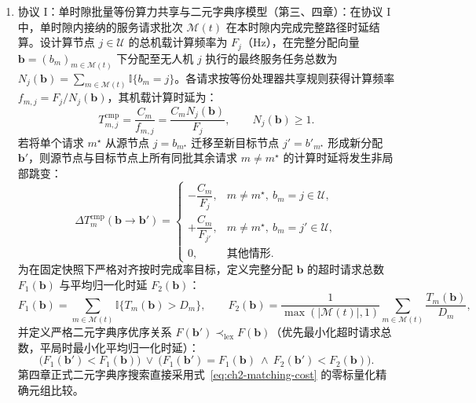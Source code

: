 \begin{enumerate}
\item 协议 I：单时隙批量等份算力共享与二元字典序模型（第三、四章）：在协议 I 中，单时隙内接纳的服务请求批次 $\mathcal{M}(t)$ 在本时隙内完成完整路径时延结算。设计算节点 $j\in\mathcal{U}$ 的总机载计算频率为 $F_j$（$\mathrm{Hz}$），在完整分配向量 $\mathbf{b}=(b_m)_{m\in\mathcal{M}(t)}$ 下分配至无人机 $j$ 执行的最终服务任务总数为 $N_j(\mathbf{b})=\sum_{m\in\mathcal{M}(t)}\mathbb{I}\{b_m=j\}$。各请求按等份处理器共享规则获得计算频率 $f_{m,j}=F_j/N_j(\mathbf{b})$，其机载计算时延为：
\begin{equation}
    T^{\mathrm{cmp}}_{m,j}=\frac{C_m}{f_{m,j}}
    =\frac{C_m N_j(\mathbf{b})}{F_j},\qquad N_j(\mathbf{b})\geq 1.
    \label{eq:ch2-shared-computation}
\end{equation}
若将单个请求 $m^\star$ 从源节点 $j=b_{m^\star}$ 迁移至新目标节点 $j'=b'_{m^\star}$ 形成新分配 $\mathbf{b}'$，则源节点与目标节点上所有同批其余请求 $m\neq m^\star$ 的计算时延将发生非局部跳变：
\begin{equation}
    \Delta T_m^{\mathrm{cmp}}(\mathbf{b}\to\mathbf{b}')=
    \begin{cases}
        -\dfrac{C_m}{F_j}, & m\neq m^\star,\ b_m=j\in\mathcal{U},\\[6pt]
        +\dfrac{C_m}{F_{j'}}, & m\neq m^\star,\ b_m=j'\in\mathcal{U},\\[6pt]
        0, & \text{其他情形}.
    \end{cases}
    \label{eq:ch2-batch-externality}
\end{equation}
为在固定快照下严格对齐按时完成率目标，定义完整分配 $\mathbf{b}$ 的超时请求总数 $F_1(\mathbf{b})$ 与平均归一化时延 $F_2(\mathbf{b})$：
\begin{equation}
    F_1(\mathbf{b})=\sum_{m\in\mathcal{M}(t)}\mathbb{I}\big\{T_m(\mathbf{b})>D_m\big\},\qquad
    F_2(\mathbf{b})=\frac{1}{\max(|\mathcal{M}(t)|,1)}\sum_{m\in\mathcal{M}(t)}\frac{T_m(\mathbf{b})}{D_m},
    \label{eq:ch2-lexicographic-pair}
\end{equation}
并定义严格二元字典序优序关系 $F(\mathbf{b}')\prec_{\mathrm{lex}}F(\mathbf{b})$（优先最小化超时请求总数，平局时最小化平均归一化时延\cite{marler2004survey}）：
\begin{equation}
    \Big(F_1(\mathbf{b}') < F_1(\mathbf{b})\Big)
    \ \lor\ 
    \Big(F_1(\mathbf{b}') = F_1(\mathbf{b})\ \land\ F_2(\mathbf{b}') < F_2(\mathbf{b})\Big).
    \label{eq:ch2-matching-cost}
\end{equation}
第四章正式二元字典序搜索直接采用式~\eqref{eq:ch2-matching-cost} 的零标量化精确元组比较。


\end{enumerate}

